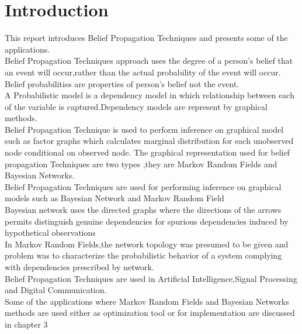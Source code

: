 \chapter{\textbf{Introduction}}
This report introduces Belief Propagation Techniques and presents some of the  applications.
\\ Belief Propagation Techniques approach uses the degree of a person's belief that an event will occur,rather than the actual probability  of the event will occur.
Belief probabilities are  properties of person's belief not the event.
\\ A Probabilistic model is a dependency model in which relationship between  each of the variable is captured.Dependency models  are represent by graphical methods.
\\ Belief Propagation Technique is used to perform inference on graphical  model  such as factor graphs which calculates marginal distribution for each unobserved node
conditional on observed node.
The graphical representation used for belief propagation Techniques are two types ,they are Markov  Random Fields and  Bayesian Networks.\cite{Hans Andrea Loeliger}
\\Belief Propagation Techniques  are used for performing inference on graphical models such as Bayesian Network and Markov Random Field\cite{Judea Pearl}
\\Bayesian network uses the directed graphs where the directions of the arrows permits distinguish genuine dependencies for spurious dependencies induced by hypothetical observations
\\In Markov Random  Fields,the network topology was presumed to be given and problem was to characterize the probabilistic  behavior  of a system complying with dependencies prescribed by network.
\\Belief Propagation Techniques are used in  Artificial Intelligence,Signal Processing and  Digital Communication.
\\Some of the applications where Markov  Random Fields and  Bayesian Networks  methods are used  either as  optimization tool or for implementation  are discussed in chapter 3

